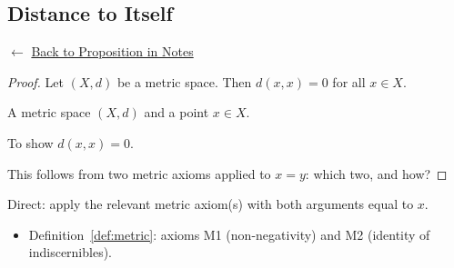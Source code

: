 
\subsection*{Distance to Itself}
\label{prf:distance-to-itself}

\begin{remark*}[Return]
$\leftarrow$ \hyperref[prop:distance-to-itself]{Back to Proposition in Notes}
\end{remark*}

\begin{proof}
\Claim Let $(X,d)$ be a metric space. Then $d(x,x) = 0$ for all $x \in X$.

\Given A metric space $(X,d)$ and a point $x \in X$.

\Goal To show $d(x,x) = 0$.

\Strategy This follows from two metric axioms applied to $x = y$: which two, and how?


\end{proof}

\begin{remark*}
Direct: apply the relevant metric axiom(s) with both arguments equal to $x$.
\end{remark*}

\begin{remark*}[Dependencies]
\begin{itemize}
  \item Definition~\ref{def:metric}: axioms M1 (non-negativity) and M2 (identity of indiscernibles).
\end{itemize}
\end{remark*}
